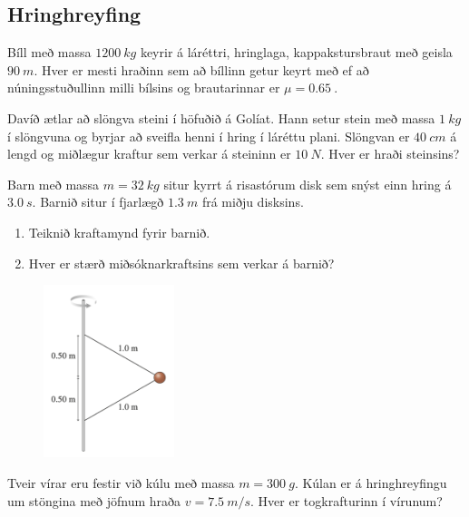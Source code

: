 \begin{enumerate}[label = \textbf{Dæmi \thechapter.\arabic*.}]
\subsection*{Hringhreyfing}

\item Bíll með massa $\SI{1200}{kg}$ keyrir á láréttri, hringlaga, kappakstursbraut með geisla $\SI{90}{m}$. Hver er mesti hraðinn sem að bíllinn getur keyrt með ef að núningsstuðullinn milli bílsins og brautarinnar er $\mu = \SI{0.65}{}$.

\item Davíð ætlar að slöngva steini í höfuðið á Golíat. Hann setur stein með massa $\SI{1}{kg}$ í slöngvuna og byrjar að sveifla henni í hring í láréttu plani. Slöngvan er $\SI{40}{cm}$ á lengd og miðlægur kraftur sem verkar á steininn er $\SI{10}{N}$. Hver er hraði steinsins?

\item Barn með massa $m = \SI{32}{kg}$ situr kyrrt á risastórum disk sem snýst einn hring á $\SI{3.0}{s}$. Barnið situr í fjarlægð $\SI{1.3}{m}$ frá miðju disksins.
\begin{enumerate}[label = \textbf{(\alph*)}]
    \item Teiknið kraftamynd fyrir barnið.
    \item Hver er stærð miðsóknarkraftsins sem verkar á barnið?
\end{enumerate}

\begin{minipage}{\linewidth}
\begin{figure}
\vspace{-2.5cm}
\includegraphics[width=1.5in]{images/hringhreyfing1.png}
\end{figure}

\item Tveir vírar eru festir við kúlu með massa $m = \SI{300}{g}$. Kúlan er á hringhreyfingu um stöngina með jöfnum hraða $v = \SI{7.5}{m/s}$. Hver er togkrafturinn í vírunum?
\end{minipage}


\end{enumerate}
